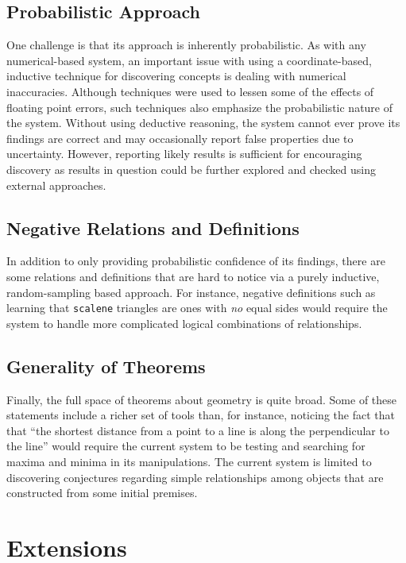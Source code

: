 \subsection{Probabilistic Approach}

One challenge is that its approach is inherently probabilistic. As
with any numerical-based system, an important issue with using a
coordinate-based, inductive technique for discovering concepts is
dealing with numerical inaccuracies. Although techniques were used to
lessen some of the effects of floating point errors, such techniques
also emphasize the probabilistic nature of the system.  Without using
deductive reasoning, the system cannot ever prove its findings are
correct and may occasionally report false properties due to
uncertainty. However, reporting likely results is sufficient for
encouraging discovery as results in question could be further explored
and checked using external approaches.

\subsection{Negative Relations and Definitions}

In addition to only providing probabilistic confidence of its
findings, there are some relations and definitions that are hard to
notice via a purely inductive, random-sampling based approach. For
instance, negative definitions such as learning that \texttt{scalene}
triangles are ones with \emph{no} equal sides would require the
system to handle more complicated logical combinations of
relationships.

\subsection{Generality of Theorems}

Finally, the full space of theorems about geometry is quite broad.
Some of these statements include a richer set of tools than, for
instance, noticing the fact that that ``the shortest distance from a
point to a line is along the perpendicular to the line'' would require
the current system to be testing and searching for maxima and minima
in its manipulations. The current system is limited to discovering
conjectures regarding simple relationships among objects that are
constructed from some initial premises.

\section{Extensions}

